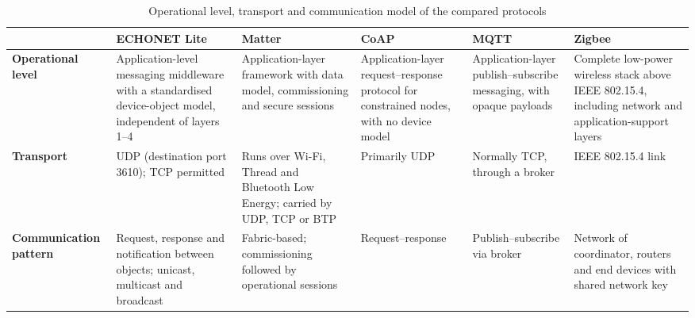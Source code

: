 \begin{table}[htbp]
  \centering
  \caption{Operational level, transport and communication model of the compared protocols}
  \label{tab:compare-function}
  \scriptsize
  \setlength{\tabcolsep}{3pt}
  \renewcommand{\arraystretch}{1.2}
  \begin{tabularx}{\textwidth}{@{}>{\raggedright\arraybackslash}p{2.1cm} >{\raggedright\arraybackslash}X >{\raggedright\arraybackslash}X >{\raggedright\arraybackslash}X >{\raggedright\arraybackslash}X >{\raggedright\arraybackslash}X@{}}
    \toprule
     & \textbf{ECHONET Lite}                                                                                                            & \textbf{Matter} & \textbf{CoAP} & \textbf{MQTT} & \textbf{Zigbee} \\
    \midrule
    \textbf{Operational level}
     & Application-level messaging middleware with a standardised device-object model, independent of layers 1--4 \cite{ECHONETPart2}
     & Application-layer framework with data model, commissioning and secure sessions \cite{Zohdi2026,phamMatterECHONETLite2024}
     & Application-layer request--response protocol for constrained nodes, with no device model \cite{RFC7252}
     & Application-layer publish--subscribe messaging, with opaque payloads \cite{MQTT5}
     & Complete low-power wireless stack above IEEE 802.15.4, including network and application-support layers \cite{SiliconLabsZigbee}                                                                     \\
    \addlinespace
    \textbf{Transport}
     & UDP (destination port 3610); TCP permitted \cite{ECHONETPart2}
     & Runs over Wi-Fi, Thread and Bluetooth Low Energy; carried by UDP, TCP or BTP \cite{Zohdi2026}
     & Primarily UDP \cite{RFC7252}
     & Normally TCP, through a broker \cite{MQTT5}
     & IEEE 802.15.4 link \cite{SiliconLabsZigbee}                                                                                                                                                          \\
    \addlinespace
    \textbf{Communication pattern}
     & Request, response and notification between objects; unicast, multicast and broadcast \cite{ECHONETPart2}
     & Fabric-based; commissioning followed by operational sessions \cite{Zohdi2026}
     & Request--response \cite{RFC7252}
     & Publish--subscribe via broker \cite{MQTT5}
     & Network of coordinator, routers and end devices with shared network key \cite{SiliconLabsZigbee}                                                                                                     \\
    \bottomrule
  \end{tabularx}
\end{table}


